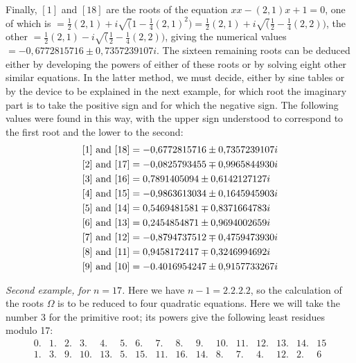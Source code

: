 Finally, \([1]\) and \([18]\) are the roots of the equation \(xx-(2,1)x+1=0\), one of which is \(=\frac12(2,1)+i\surd(1-\frac14(2,1)^2)=\frac12(2,1)+i\surd(\frac12-\frac14(2,2))\), the other \(=\frac12(2,1)-i\surd(\frac12-\frac14(2,2))\), giving the numerical values \(=-0{,}6772815716\pm0{,}7357239107i\). The sixteen remaining roots can be deduced either by developing the powers of either of these roots or by solving eight other similar equations. In the latter method, we must decide, either by sine tables or by the device to be explained in the next example, for which root the imaginary part is to take the positive sign and for which the negative sign. The following values were found in this way, with the upper sign understood to correspond to the first root and the lower to the second: \[\begin{aligned}\relax[1]\text{ and }[18]&=-0{,}6772815716\pm0{,}7357239107i\\\relax[2]\text{ and }[17]&=-0{,}0825793455\mp0{,}9965844930i\\\relax[3]\text{ and }[16]&=0{,}7891405094\pm0{,}6142127127i\\\relax[4]\text{ and }[15]&=-0{,}9863613034\pm0{,}1645945903i\\\relax[5]\text{ and }[14]&=0{,}5469481581\mp0{,}8371664783i\\\relax[6]\text{ and }[13]&=0{,}2454854871\pm0{,}9694002659i\\\relax[7]\text{ and }[12]&=-0{,}8794737512\mp0{,}4759473930i\\\relax[8]\text{ and }[11]&=0{,}9458172417\mp0{,}3246994692i\\\relax[9]\text{ and }[10]&=-0.4016954247\pm0{,}9157733267i\end{aligned}\]


\textit{Second example, for \(n=17\).} Here we have \(n-1=2.2.2.2\), so the calculation of the roots \(\Omega\) is to be reduced to four quadratic equations. Here we will take the number 3 for the primitive root; its powers give the following least residues modulo 17: {\small\setlength{\arraycolsep}{2pt}\[\begin{array}{rrrrrrrrrrrrrrrr}0.&1.&2.&3.&4.&5.&6.&7.&8.&9.&10.&11.&12.&13.&14.&15\\1.&3.&9.&10.&13.&5.&15.&11.&16.&14.&8.&7.&4.&12.&2.&6\end{array}\]}

